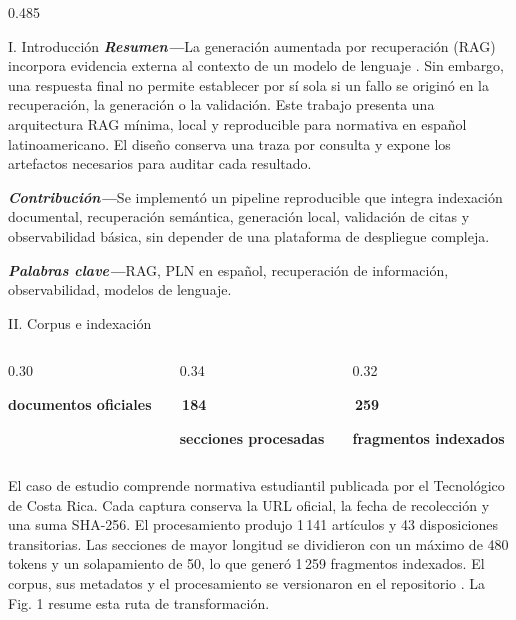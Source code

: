 \documentclass[final]{beamer}
\newcommand{\smalltext}{\fontsize{25}{29}\selectfont}
\begin{document}
\begin{frame}[t]
\begin{columns}[T,totalwidth=\textwidth]
\begin{column}{0.485\textwidth}
\begin{block}{I. Introducción}
\noindent\textbf{\textit{Resumen---}}La generación aumentada por recuperación
(RAG) incorpora evidencia externa al contexto de un modelo de lenguaje
\cite{lewis2020rag}. Sin embargo, una respuesta final no permite establecer por
sí sola si un fallo se originó en la recuperación, la generación o la
validación. Este trabajo presenta una arquitectura RAG mínima, local y
reproducible para normativa en español latinoamericano. El diseño conserva una
traza por consulta y expone los artefactos necesarios para auditar cada
resultado.

\vspace{0.30cm}
\noindent\textbf{\textit{Contribución---}}Se implementó un pipeline
reproducible que integra indexación documental, recuperación semántica,
generación local, validación de citas y observabilidad básica, sin depender de
una plataforma de despliegue compleja.

\vspace{0.30cm}
{\smalltext\noindent\textbf{\textit{Palabras clave---}}RAG, PLN en español,
recuperación de información, observabilidad, modelos de lenguaje.}
\end{block}

\begin{block}{II. Corpus e indexación}
\begin{columns}[T,totalwidth=\linewidth]
  \begin{column}{0.30\linewidth}
    {\color{Teal}\bfseries\fontsize{42}{45}\par}
    {\bfseries\smalltext documentos oficiales}
  \end{column}
  \begin{column}{0.34\linewidth}
    {\color{Teal}\bfseries\fontsize{42}{45}\,184\par}
    {\bfseries\smalltext secciones procesadas}
  \end{column}
  \begin{column}{0.32\linewidth}
    {\color{Teal}\bfseries\fontsize{42}{45}\,259\par}
    {\bfseries\smalltext fragmentos indexados}
  \end{column}
\end{columns}

\vspace{0.55cm}
El caso de estudio comprende normativa estudiantil publicada por el
Tecnológico de Costa Rica. Cada captura conserva la URL oficial, la fecha de
recolección y una suma SHA-256. El procesamiento produjo 1\,141 artículos y 43
disposiciones transitorias. Las secciones de mayor longitud se dividieron con
un máximo de 480 tokens y un solapamiento de 50, lo que generó 1\,259
fragmentos indexados. El corpus, sus metadatos y el procesamiento se
versionaron en el repositorio \cite{tec2026reglamentos}. La Fig. 1 resume esta
ruta de transformación.
\end{block}


\end{column}
\end{columns}
\end{frame}
\end{document}
